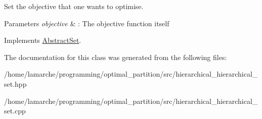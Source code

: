 Set the objective that one wants to optimise. 


\begin{DoxyParams}{Parameters}
{\em objective} & \-: The objective function itself \\
\hline
\end{DoxyParams}


Implements \hyperlink{classAbstractSet_a7aef71679a18ab7965d1098da15b26c2}{Abstract\-Set}.



The documentation for this class was generated from the following files\-:\begin{DoxyCompactItemize}
\item 
/home/lamarche/programming/optimal\-\_\-partition/src/hierarchical\-\_\-hierarchical\-\_\-set.\-hpp\item 
/home/lamarche/programming/optimal\-\_\-partition/src/hierarchical\-\_\-hierarchical\-\_\-set.\-cpp\end{DoxyCompactItemize}
